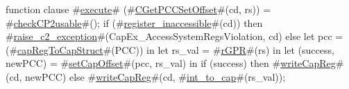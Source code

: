 function clause #\hyperref[zexecute]{execute}# (#\hyperref[zCGetPCCSetOffset]{CGetPCCSetOffset}#(cd, rs)) =
{
  #\hyperref[zcheckCPtwousable]{checkCP2usable}#();
  if (#\hyperref[zregisterzyinaccessible]{register\_inaccessible}#(cd)) then
    #\hyperref[zraisezyctwozyexception]{raise\_c2\_exception}#(CapEx_AccessSystemRegsViolation, cd)
  else
    let pcc = (#\hyperref[zcapRegToCapStruct]{capRegToCapStruct}#(PCC)) in
    let rs_val = #\hyperref[zrGPR]{rGPR}#(rs) in
    let (success, newPCC) = #\hyperref[zsetCapOffset]{setCapOffset}#(pcc, rs_val) in
    if (success) then
        #\hyperref[zwriteCapReg]{writeCapReg}#(cd, newPCC)
    else
        #\hyperref[zwriteCapReg]{writeCapReg}#(cd, #\hyperref[zintzytozycap]{int\_to\_cap}#(rs_val));
}
